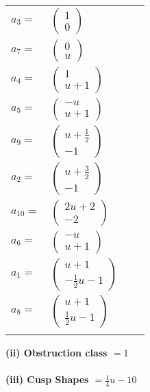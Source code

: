 \documentclass[1p]{elsarticle_modified}
\theoremstyle{definition}
\begin{document}
\begin{tabular}{m{7pt} m{180pt} m{7pt} m{180pt} }
\flushright $a_{3}=$&$\begin{pmatrix}1\\0\end{pmatrix}$ \\
\flushright $a_{7}=$&$\begin{pmatrix}0\\u\end{pmatrix}$ \\
\flushright $a_{4}=$&$\begin{pmatrix}1\\u+1\end{pmatrix}$ \\
\flushright $a_{5}=$&$\begin{pmatrix}- u\\u+1\end{pmatrix}$ \\
\flushright $a_{9}=$&$\begin{pmatrix}u+\frac{1}{2}\\-1\end{pmatrix}$ \\
\flushright $a_{2}=$&$\begin{pmatrix}u+\frac{3}{2}\\-1\end{pmatrix}$ \\
\flushright $a_{10}=$&$\begin{pmatrix}2 u+2\\-2\end{pmatrix}$ \\
\flushright $a_{6}=$&$\begin{pmatrix}- u\\u+1\end{pmatrix}$ \\
\flushright $a_{1}=$&$\begin{pmatrix}u+1\\-\frac{1}{2} u-1\end{pmatrix}$ \\
\flushright $a_{8}=$&$\begin{pmatrix}u+1\\\frac{1}{2} u-1\end{pmatrix}$\\&\end{tabular}
\flushleft \textbf{(ii) Obstruction class $= 1$}\\~\\
\flushleft \textbf{(iii) Cusp Shapes $= \frac{1}{4} u-10$}\\~\\
\end{document}
